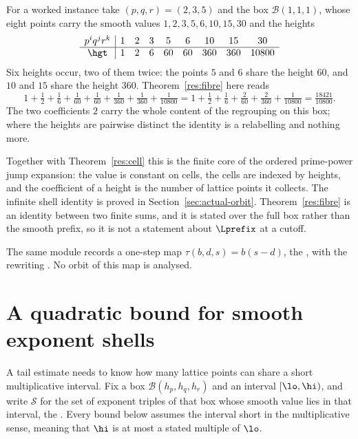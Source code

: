 For a worked instance take $(p,q,r)=(2,3,5)$ and the box $\mathcal B(1,1,1)$,
whose eight points carry the smooth values $1,2,3,5,6,10,15,30$ and the heights
\[
\begin{array}{c|cccccccc}
p^{i}q^{j}r^{k}&1&2&3&5&6&10&15&30\\ \hline
\hgt&1&2&6&60&60&360&360&10800
\end{array}
\]
Six heights occur, two of them twice: the points $5$ and $6$ share the height
$60$, and $10$ and $15$ share the height $360$.  Theorem~\ref{res:fibre} here
reads
\[
 1+\tfrac12+\tfrac16+\tfrac1{60}+\tfrac1{60}+\tfrac1{360}+\tfrac1{360}
 +\tfrac1{10800}
 =1+\tfrac12+\tfrac16+\tfrac2{60}+\tfrac2{360}+\tfrac1{10800}
 =\tfrac{18421}{10800}.
\]
The two coefficients $2$ carry the whole content of the regrouping on this box;
where the heights are pairwise distinct the identity is a relabelling and
nothing more.

Together with Theorem~\ref{res:cell} this is the finite core of the ordered
prime-power jump expansion: the value is constant on cells, the cells are
indexed by heights, and the coefficient of a height is the number of lattice
points it collects.  The infinite shell identity is proved in Section~\ref{sec:actual-orbit}.  Theorem~\ref{res:fibre} is an identity between two finite sums,
and it is stated over the full box rather than the smooth prefix, so it is not
a statement about $\Lprefix$ at a cutoff.

The same module records a one-step map $\tau(b,d,s)=b(s-d)$, the
, with the rewriting
.  No orbit of this map is analysed.



\section{A quadratic bound for smooth exponent shells}\label{sec:shell}

A tail estimate needs to know how many lattice points can share a short
multiplicative interval.  Fix a box $\mathcal B(h_p,h_q,h_r)$ and an interval
$[\lo,\hi)$, and write $\mathcal S$ for the set of exponent triples of that box
whose smooth value lies in that interval, the
.  Every bound below assumes the interval short in the
multiplicative sense, meaning that $\hi$ is at most a stated multiple of $\lo$.

